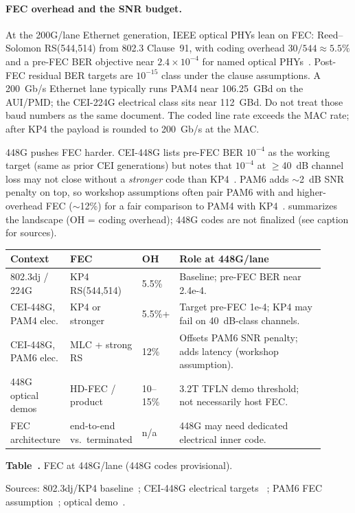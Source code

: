 \paragraph{FEC overhead and the SNR budget.}

At the 200G/lane Ethernet generation, IEEE optical PHYs lean on  FEC:
Reed--Solomon RS(544,514) from 802.3 Clause~91, with coding overhead
$30/544\approx5.5\%$ and a pre-FEC BER objective near $2.4\times10^{-4}$ for named
optical PHYs~. Post-FEC residual BER targets are
$10^{-15}$ class under the clause assumptions. A 200~Gb/s Ethernet lane typically
runs PAM4 near 106.25~GBd on the AUI/PMD; the CEI-224G electrical class sits near
112~GBd. Do not treat those baud numbers as the same document. The coded line
rate exceeds the MAC rate; after KP4 the payload is rounded to 200~Gb/s at the MAC.

448G pushes FEC harder. CEI-448G lists pre-FEC BER $10^{-4}$ as the working target
(same as prior CEI generations) but notes that $10^{-4}$ at $\ge$40~dB channel loss
may not close without a \emph{stronger} code than KP4~. PAM6 adds
$\sim$2~dB SNR penalty on top, so workshop assumptions often pair PAM6 with
 and higher-overhead FEC ($\sim$12\%) for a fair comparison to PAM4 with KP4~.
 summarizes the landscape (OH = coding overhead); 448G codes are not finalized
(see caption for sources).

\begin{table}[ht]
\label{tab:448-fec}%
\centering
\setlength{\tabcolsep}{5pt}%
\renewcommand{\arraystretch}{1.25}%
\begin{tabular}{@{}p{0.19\linewidth}p{0.15\linewidth}p{0.08\linewidth}p{0.49\linewidth}@{}}
\toprule
Context & FEC & OH & Role at 448G/lane \\
\midrule
802.3dj / 224G & KP4 RS(544,514) & 5.5\% &
  Baseline; pre-FEC BER near 2.4e-4. \\
\addlinespace[1.5em]
CEI-448G, PAM4 elec. & KP4 or stronger & 5.5\%+ &
  Target pre-FEC 1e-4; KP4 may fail on 40~dB-class channels. \\
\addlinespace[1.5em]
CEI-448G, PAM6 elec. & MLC + strong RS & 12\% &
  Offsets PAM6 SNR penalty; adds latency (workshop assumption). \\
\addlinespace[1.5em]
448G optical demos & HD-FEC / product & 10--15\% &
  3.2T TFLN demo threshold; not necessarily host FEC. \\
\addlinespace[1.5em]
FEC architecture & end-to-end vs.\ terminated & n/a &
  448G may need dedicated electrical inner code. \\
\bottomrule
\end{tabular}
\par\medskip
{\raggedright\footnotesize\textbf{Table~\thetable.} FEC at 448G/lane (448G codes provisional).\par}
\end{table}
Sources: 802.3dj/KP4 baseline~; CEI-448G electrical
targets ~; PAM6 FEC assumption~; optical
 demo~.

